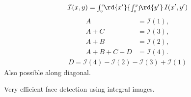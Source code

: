 \begin{compactdesc}
\begin{gather*}
		 \mathcal{I}(x,y)={\scriptstyle\int_{0}^{x}}\!\rd{x'}{\scriptstyle\int_{0}^{y}}\!\rd{y'}\, I(x',y')
	 \end{gather*}
	 \begin{align*}
		 A&=\mathcal{I}(1),\\
		 A+C&=\mathcal{I}(3),\\
		 A+B&=\mathcal{I}(2),\\
		 A+B+C+D&=\mathcal{I}(4).
	 \end{align*}
	 \begin{gather*}
		 D=\mathcal{I}(4)-\mathcal{I}(2)-\mathcal{I}(3)+\mathcal{I}(1)
	 \end{gather*}
	 Also possible along diagonal.
 \item[\lp{Viola-Jones cascade face detection}] Very efficient face detection using integral images.
\end{compactdesc}
